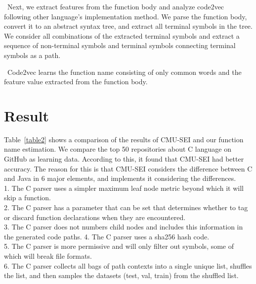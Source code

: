 \documentclass[JIP]{apris}
\begin{document}
 Next, we extract features from the function body and analyze code2vec following other language's implementation method.
We parse the function body, convert it to an abstract syntax tree, and extract all terminal symbols in the tree.
We consider all combinations of the extracted terminal symbols and extract a sequence of non-terminal symbols and terminal symbols connecting terminal symbols as a path.

 Code2vec learns the function name consisting of only common words and the feature value extracted from the function body.


\section{Result}
Table~\ref{table2} shows a comparison of the results of CMU-SEI and our function name estimation.  
We compare the top 50 repositories about C language on GitHub as learning data. According to this, it found that CMU-SEI had better accuracy. 
The reason for this is that CMU-SEI considers the difference between C and Java in 6 major elements, and implements it considering the differences.\\
1. The C parser uses a simpler maximum leaf node metric beyond which it will skip a function.\\
2. The C parser has a parameter that can be set that determines whether to tag or discard function declarations when they are encountered.\\
3. The C parser does not numbers child nodes and includes this information in the generated code paths.
4. The C parser uses a sha256 hash code.\\
5. The C parser is more permissive and will only filter out symbols, some of which will break file formats.\\
6. The C parser collects all bags of path contexts into a single unique list, shuffles the list, and then samples the datasets (test, val, train) from the shuffled list.
\end{document}
